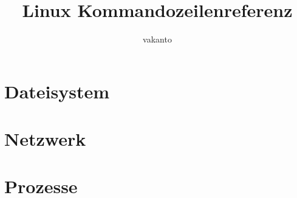 \documentclass[a4paper,12pt,titlepage]{article}
\begin{document}
\begin{titlepage}
\title{Linux Kommandozeilenreferenz}
\author{vakanto}
\maketitle
\tableofcontents
\newpage
\section{Dateisystem}
\newpage
\section{Netzwerk}
\newpage
\section{Prozesse}
\end{titlepage}
\end{document}
